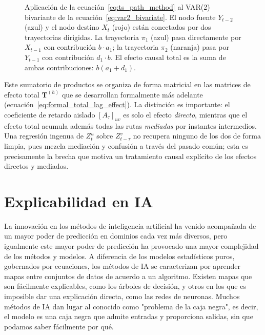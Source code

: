 \documentclass[12pt]{report} %
\begin{document}
\begin{figure}[H]
    \endgroup
    \caption[Método de las trayectorias: efecto causal total de $Y_{t-2}$ sobre $X_t$]{%
        Aplicación de la ecuación~\eqref{eq:ts_path_method} al VAR(2) bivariante de la
        ecuación~\eqref{eq:var2_bivariate}. El nodo fuente $Y_{t-2}$ (azul) y el nodo
        destino $X_t$ (rojo) están conectados por dos trayectorias dirigidas.
        La trayectoria \textcolor{blue!70!black}{$\pi_1$} (azul) pasa directamente por
        $X_{t-1}$ con contribución $b\cdot a_1$; la trayectoria
        \textcolor{orange!80!black}{$\pi_2$} (naranja) pasa por $Y_{t-1}$ con
        contribución $d_1\cdot b$. El efecto causal total es la suma de ambas
        contribuciones: $b(a_1+d_1)$.}
    \label{fig:ts_path_method_example}
\end{figure}

Este sumatorio de productos se organiza de forma matricial en las matrices de efecto total $\mathbf{T}^{(h)}$ que se desarrollan formalmente más adelante (ecuación~\eqref{eq:formal_total_lag_effect}). La distinción es importante: el coeficiente de retardo aislado $[A_\tau]_{uv}$ es solo el efecto \emph{directo}, mientras que el efecto total acumula además todas las rutas \emph{mediadas} por instantes intermedios. Una regresión ingenua de $Z^u_t$ sobre $Z^v_{t-\tau}$ no recupera ninguno de los dos de forma limpia, pues mezcla mediación y confusión a través del pasado común; esta es precisamente la brecha que motiva un tratamiento causal explícito de los efectos directos y mediados.

\section{Explicabilidad en IA}

La innovación en los métodos de inteligencia artificial ha venido acompañada de un mayor poder de predicción en dominios cada vez más diversos, pero igualmente este mayor poder de predicción ha provocado una mayor complejidad de los métodos y modelos. A diferencia de los modelos estadísticos puros, gobernados por ecuaciones, los métodos de IA se caracterizan por aprender mapas entre conjuntos de datos de acuerdo a un algoritmo. Existen mapas que son fácilmente explicables, como los árboles de decisión, y otros en los que es imposible dar una explicación directa, como las redes de neuronas. Muchos métodos de IA dan lugar al conocido como "problema de la caja negra", es decir, el modelo es una caja negra que admite entradas y proporciona salidas, sin que podamos saber fácilmente por qué.
\end{document}
